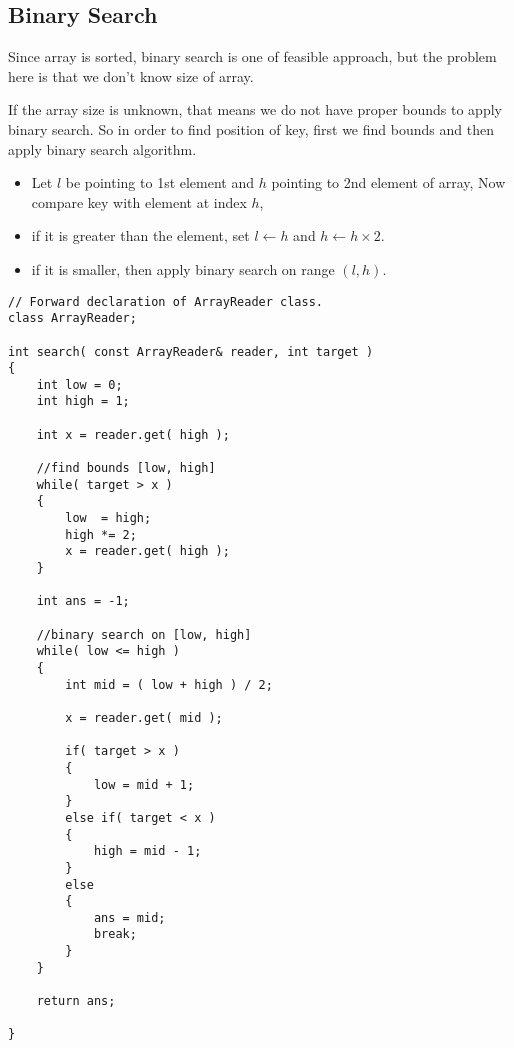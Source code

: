 \subsection{Binary Search}
Since array is sorted, binary search is one of feasible approach, but the problem here is that we don’t know size of array.

If the array size is unknown, that means we do not have proper bounds to apply binary search. So in order to find position of key, first we find bounds and then apply binary search algorithm.
\begin{itemize}
    \item Let $l$ be pointing to 1st element and $h$ pointing to 2nd element of array, Now compare key with element at index $h$,
    \item if it is greater than the element, set $l\gets h$ and $h\gets h\times 2$.
    \item if it is smaller, then apply binary search on range $(l,h)$.
\end{itemize}

\setcounter{lstlisting}{0}
\begin{lstlisting}[style=customc, caption={Binary Search}]
// Forward declaration of ArrayReader class.
class ArrayReader;

int search( const ArrayReader& reader, int target )
{
    int low = 0;
    int high = 1;

    int x = reader.get( high );

    //find bounds [low, high]
    while( target > x )
    {
        low  = high;
        high *= 2;
        x = reader.get( high );
    }

    int ans = -1;

    //binary search on [low, high]
    while( low <= high )
    {
        int mid = ( low + high ) / 2;

        x = reader.get( mid );

        if( target > x )
        {
            low = mid + 1;
        }
        else if( target < x )
        {
            high = mid - 1;
        }
        else
        {
            ans = mid;
            break;
        }
    }

    return ans;

}
\end{lstlisting}